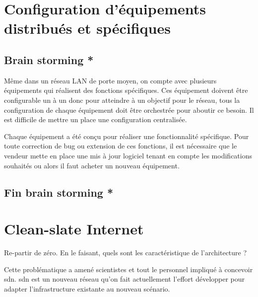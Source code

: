 \section{Configuration d'équipements distribués et spécifiques}

\subsection*{Brain storming *}

Même dans un réseau LAN de porte moyen,  on compte avec plusieurs équipements qui réalisent des fonctions spécifiques. Ces équipement doivent être configurable un à un donc pour atteindre à un objectif pour le réseau, tous la configuration de chaque équipement doit être orchestrée pour aboutir ce besoin. Il est difficile de mettre un place une configuration centralisée.

\par
Chaque équipement a été conçu pour réaliser une fonctionnalité spécifique. Pour toute correction de bug ou extension de ces fonctions,  il est nécessaire que le vendeur mette en place une mis à jour logiciel tenant en compte les modifications souhaités ou alors il faut acheter un nouveau équipement. 

\subsection*{Fin brain storming *}



\section{Clean-slate Internet}

Re-partir de zéro. En le faisant, quels sont les caractéristique de l'architecture ?


Cette problématique a amené scientistes et tout le personnel impliqué à concevoir \gls{sdn}. \gls{sdn} est un nouveau  réseau qu'on fait actuellement l'effort développer pour adapter l'infrastructure existante au nouveau scénario.